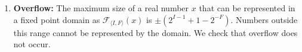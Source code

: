 \documentclass[runningheads,a4paper]{llncs}
\newcommand{\mat}[1]{\boldsymbol{#1}}
\begin{document}
\begin{enumerate}
\item {\bf Overflow:}
The maximum size of a real number $x$ that can be represented in a fixed
point domain as $\mathcal{F}_{\langle I,F \rangle}(x)$ is $\pm
(2^{I-1}+1-2^{-F})$.  Numbers outside this range cannot be represented by
the domain.  We check that overflow does not occur.

\end{enumerate}



\end{document}
